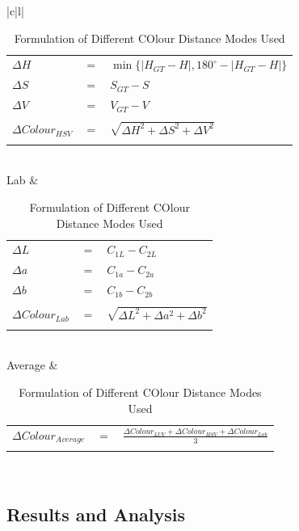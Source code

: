 \begin{table}[tb!]
\begin{tabular}{|c|l|}
\begin{tabular}{lcl}
$\Delta{H}$ & $=$ & $\min\{ \mid H_{GT} - H \mid,  180^{\circ} - \mid H_{GT} - H \mid  \}$ \\
$\Delta{S}$ & $=$ & $S_{GT} - S$ \\
$\Delta{V}$ &  $=$ & $V_{GT} - V$ \\
\\
$\Delta Colour_{HSV}$ & $=$ & $\sqrt{\Delta{H}^{2} + \Delta{S}^{2}  + \Delta{V}^{2} }$
\\
\hspace{4em}& & \\
\end{tabular}\\
\hline
Lab &
\begin{tabular}{lcl}
\\
$\Delta L$ & $=$ & $C_{1L} - C_{2L}$\\
$\Delta a$ & $=$ & $C_{1a} - C_{2a}$\\
$\Delta b$ & $=$ & $C_{1b} - C_{2b}$\\
\\
$\Delta{Colour_{Lab}}$ & $=$ & $\sqrt{\Delta{L}^{2} + \Delta{a}^{2}  + \Delta{b}^{2} }$
\\
\hspace{5em}& & \\
\end{tabular}\\
\hline
Average &
\begin{tabular}{lcl}
\\
$\Delta{Colour_{Average}}$ & $=$ & $\frac{\Delta{Colour_{LUV}} + \Delta{Colour_{HSV}} + \Delta{Colour_{Lab}}}{3}$
\\
\hspace{4em}& & \\
\end{tabular}\\
\hline
\end{tabular}
  \caption{Formulation of Different COlour Distance Modes Used}
\label{table:ColorVariation}
\end{table}

\subsection{Results and Analysis}

